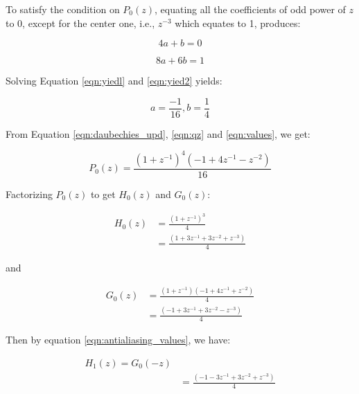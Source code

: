 To satisfy the condition on $P_0(z)$, equating all the coefficients of odd power of $z$ to 0, except for the center one, i.e., $z^{-3}$ which equates to 1, produces:

 \begin{equation}\label{eqn:yiedl} 
{4a + b = 0}
\end{equation}


\begin{equation}\label{eqn:yied2} 
{8a + 6b = 1}
\end{equation}

Solving Equation \ref{eqn:yiedl} and \ref{eqn:yied2} yields:

\begin{equation}\label{eqn:values} 
{a = \frac{-1}{16}, b=\frac{1}{4}}
\end{equation}


From Equation \ref{eqn:daubechies_upd}, \ref{eqn:qz} and \ref{eqn:values}, we get:

\begin{equation} 
{P_0(z) = \frac{(1 + z^{-1})^4(-1 + 4z^{-1} - z^{-2})}{16}}
\end{equation}

Factorizing $P_0(z)$ to get $H_0(z)$ and $G_0(z)$:

\begin{equation} \label{eq1}
\begin{split}
H_0(z) & = \frac{(1 + z^{-1})^3}{4} \\
& = \frac{(1 + 3z^{-1} + 3z^{-2} + z^{-3})}{4}
\end{split}
\end{equation}


and


\begin{equation} \label{eq1}
\begin{split}
G_0(z) & = \frac{(1 + z^{-1})(-1 + 4z^{-1} + z^{-2})}{4} \\
& = \frac{(-1 + 3z^{-1} + 3z^{-2} - z^{-3})}{4}
\end{split}
\end{equation}


Then by equation \ref{eqn:antialiasing_values}, we have:


\begin{equation} \label{eq1}
\begin{split}
H_1(z) = G_0(-z) \\
& = \frac{(-1 - 3z^{-1} + 3z^{-2} + z^{-3})}{4}
\end{split}
\end{equation}

